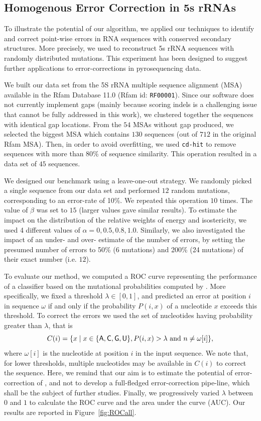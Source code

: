 \subsection{Homogenous Error Correction in 5s rRNAs}
\label{sec:5S}
To illustrate the potential of our algorithm, we applied our techniques to identify and correct point-wise errors in RNA sequences
with conserved secondary structures. More precisely, we used \RNApyro to reconstruct 5s rRNA sequences with randomly distributed
mutations. This experiment has been designed to suggest further applications to error-corrections in pyrosequencing data.

We built our data set from the 5S rRNA multiple sequence alignment (MSA) available in the Rfam Database 11.0 (Rfam id: \texttt{RF00001}).
Since our software does not currently implement gaps (mainly because scoring indels is a challenging issue that cannot be fully addressed
in this work),  we clustered together the sequences with identical gap locations. From the $54$ MSAs without gap produced, we selected the
biggest MSA  which contains $130$ sequences (out of $712$ in the original Rfam MSA). Then, in order to avoid overfitting, we used \texttt{cd-hit}
\cite{Li:2006fk} to remove sequences with more than 80\% of sequence similarity. This operation resulted in a data set of $45$ sequences. 

We designed our benchmark using a leave-one-out strategy. We randomly picked a single sequence from our data set and performed $12$ random
mutations, corresponding to an error-rate of 10\%. We repeated this operation $10$ times. The value of $\beta$ was set to $15$ (larger values gave similar results). 
To estimate the impact on the distribution of the relative weights of energy and isostericity, we used 4 different values of $\alpha = {0, 0.5, 0.8, 1.0}$. 
Similarly, we also investigated the impact of an under- and over- estimate of the number of errors, by setting the presumed number of errors to 50\% (6 mutations) and 200\% (24 mutations) of their exact number (i.e. $12$).

To evaluate our method, we computed a ROC curve representing the performance of a classifier based on the mutational probabilities computed
by \RNApyro. More specifically, we fixed a threshold $\lambda \in [0,1]$, and predicted an error at position $i$ in sequence $\omega$ if and only if the
probability $P(i,x)$ of a nucleotide $x$ exceeds this threshold. To correct the errors we used the set of nucleotides having probability
greater than $\lambda$, that is  
$$C(i) = \{ x \; | \;  x \in \{ {\sf{A}},{\sf{C}},{\sf{G}},{\sf{U}} \}, P(i,x) > \lambda \mbox{ and }  n \neq \omega[i] \},$$
 where $\omega[i]$ is
the nucleotide at position $i$ in the input sequence. We note that, for lower thresholds, multiple nucleotides may be available in $C(i)$ to correct
the sequence. Here, we remind that our aim is to estimate the potential of error-correction of \RNApyro, and not to develop a full-fledged error-correction pipe-line, which  
shall be the subject of further studies. Finally, we progressively varied $\lambda$ between $0$ and $1$ to calculate the ROC curve and the area
under the curve (AUC). Our results are reported in Figure~\ref{fig:ROCall}. 

